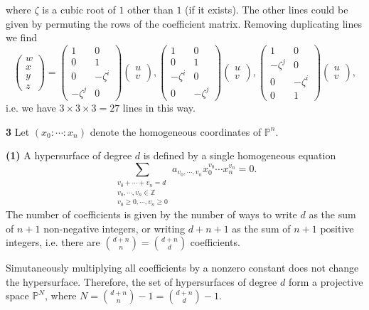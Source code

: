 \documentclass{article}
\makeatletter
\newcommand*{\shifttext}[1]{%
  \settowidth{\@tempdima}{#1}%
  \hspace{-\@tempdima}#1%
}
\newcommand{\plabel}[1]{%
\shifttext{\textbf{#1}\quad}%
}
\newcommand{\prule}{%
\begin{center}%
\hdashrule[0.5ex]{.99\linewidth}{1pt}{1pt 2.5pt}%
\end{center}%
}
\makeatother
\begin{document}
where $\zeta$ is a cubic root of $1$ other than $1$ (if it exists).
The other lines could be given by permuting the rows of the coefficient matrix.
Removing duplicating lines we find
\[ \begin{pmatrix}
    w \\ x \\ y \\ z
\end{pmatrix} = \begin{pmatrix}
    1 & 0 \\ 0 & 1 \\ 0 & -\zeta^i \\ -\zeta^j & 0
\end{pmatrix} \begin{pmatrix}
    u \\ v
\end{pmatrix}, \begin{pmatrix}
    1 & 0 \\ 0 & 1 \\ -\zeta^i & 0 \\ 0 & -\zeta^j
\end{pmatrix} \begin{pmatrix}
    u \\ v
\end{pmatrix}, \begin{pmatrix}
    1 & 0 \\ -\zeta^j & 0 \\ 0 & -\zeta^i \\ 0 & 1
\end{pmatrix} \begin{pmatrix}
    u \\ v
\end{pmatrix}, \]
i.e. we have $3\times 3\times 3 = 27$ lines in this way.

\prule

\plabel{3}%
Let $(x_0:\cdots:x_n)$ denote the homogeneous coordinates of $\mathbb{P}^n$.

\plabel{(1)}%
A hypersurface of degree $d$ is defined by a single homogeneous equation
\[ \sum_{\substack{v_0+\cdots+v_n = d \\ v_0,\cdots,v_n\in\mathbb{Z}\\ v_0\ge 0,\cdots,v_n\ge 0}} a_{v_0,\cdots,v_n} x_0^{v_0} \cdots x_n^{v_n} = 0. \]
The number of coefficients is given by the number of ways to write $d$ as the sum of $n+1$ non-negative integers, or writing $d + n + 1$ as the sum of $n+1$ positive integers, i.e. there are $\binom{d+n}{n} = \binom{d+n}{d}$ coefficients.
\par
Simutaneously multiplying all coefficients by a nonzero constant does not change the hypersurface.
Therefore, the set of hypersurfaces of degree $d$ form a projective space $\mathbb{P}^N$, where $N = \binom{d+n}{n} - 1 = \binom{d+n}{d} - 1$.
\end{document}
